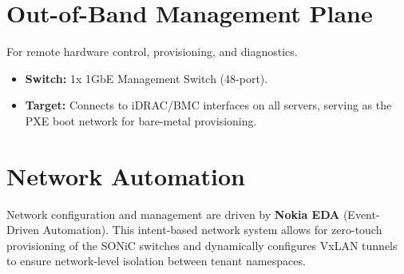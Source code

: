 \section{Out-of-Band Management Plane}
For remote hardware control, provisioning, and diagnostics.
\begin{itemize}
    \item \textbf{Switch:} 1x 1GbE Management Switch (48-port).
    \item \textbf{Target:} Connects to iDRAC/BMC interfaces on all servers, serving as the PXE boot network for bare-metal provisioning.
\end{itemize}

\section{Network Automation}
Network configuration and management are driven by \textbf{Nokia EDA} (Event-Driven Automation). This intent-based network system allows for zero-touch provisioning of the SONiC switches and dynamically configures VxLAN tunnels to ensure network-level isolation between tenant namespaces.
